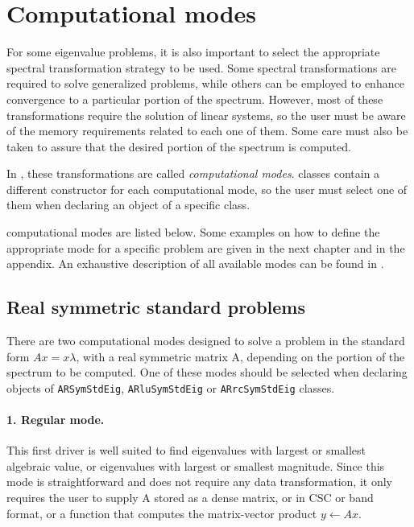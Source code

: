 \section{Computational modes}
For some eigenvalue problems, it is also important to select the appropriate spectral transformation strategy to be used. Some spectral transformations are required to solve generalized problems, while others can be employed to enhance convergence to a particular portion of the spectrum. However, most of these transformations require the solution of linear systems, so the user must be aware of the memory requirements related to each one of them. Some care must also be taken to assure that the desired portion of the spectrum is computed.

In \ARPP{}, these transformations are called \textit{computational modes}. \ARPP{} classes contain a different constructor for each computational mode, so the user must select one of them when declaring an object of a specific class.

\ARPP{} computational modes are listed below. Some examples on how to define the appropriate mode for a specific problem are given in the next chapter and in the appendix. An exhaustive description of all available \ARP{} modes can be found in \cite{T:6}.

\subsection{Real symmetric standard problems}
There are two computational modes designed to solve a problem in the standard form $Ax=x\lambda$, with a real symmetric matrix A, depending on the portion of the spectrum to be computed. One of these modes should be selected when declaring objects of \texttt{ARSymStdEig}, \texttt{ARluSymStdEig} or \texttt{ARrcSymStdEig} classes.

\paragraph{1. Regular mode.}
This first driver is well suited to find eigenvalues with largest or smallest algebraic value, or eigenvalues with largest or smallest magnitude. Since this mode is straightforward and does not require any data transformation, it only requires the user to supply A stored as a dense matrix, or in CSC or band format, or a function that computes the matrix-vector product $y \leftarrow Ax$. 


